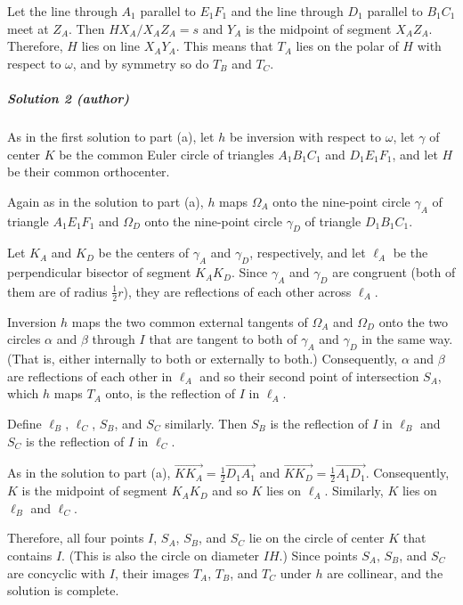 \documentclass[11pt]{scrartcl}
\begin{document}
Let the line through $A_1$ parallel to $E_1F_1$ and the line through $D_1$
parallel to $B_1C_1$ meet at $Z_A$. Then $HX_A/X_AZ_A=s$
and $Y_A$ is the midpoint of segment $X_AZ_A$. Therefore, $H$ lies on
line $X_AY_A$. This means that $T_A$ lies on the polar of $H$ with respect to
$\omega$, and by symmetry so do $T_B$ and $T_C$.


\subparagraph{Solution 2 (author)}

As in the first solution to part (a), let
$h$ be inversion with respect to $\omega$, let $\gamma$ of center $K$ be the common
Euler circle of triangles $A_1B_1C_1$ and $D_1E_1F_1$, and let $H$ be their
common orthocenter.

Again as in the solution to part (a), $h$ maps $\Omega_A$ onto the nine-point
circle $\gamma_A$ of triangle $A_1E_1F_1$ and $\Omega_D$ onto the nine-point
circle $\gamma_D$ of triangle $D_1B_1C_1$.

Let $K_A$ and $K_D$ be the centers of $\gamma_A$ and $\gamma_D$, respectively,
and let $\ell_A$ be the perpendicular bisector of segment $K_AK_D$. Since
$\gamma_A$ and $\gamma_D$ are congruent (both of them are of radius
$\frac{1}{2}r$), they are reflections of each other across $\ell_A$.

Inversion $h$ maps the two common external tangents of $\Omega_A$ and $\Omega_D$
onto the two circles $\alpha$ and $\beta$ through $I$ that are tangent to both
of $\gamma_A$ and $\gamma_D$ in the same way. (That is, either internally to both or
externally to both.) Consequently, $\alpha$ and $\beta$ are reflections of each
other in $\ell_A$ and so their second point of intersection $S_A$, which $h$
maps $T_A$ onto, is the reflection of $I$ in $\ell_A$.

Define $\ell_B$, $\ell_C$, $S_B$, and $S_C$ similarly. Then $S_B$ is the reflection of $I$ in $\ell_B$ and $S_C$ is the reflection of $I$ in $\ell_C$.

As in the solution to part (a),
$\overrightarrow{KK_A}=\frac{1}{2}\overrightarrow{D_1A_1}$ and
$\overrightarrow{KK_D}=\frac{1}{2}\overrightarrow{A_1D_1}$. Consequently, $K$ is
the midpoint of segment $K_AK_D$ and so $K$ lies on $\ell_A$. Similarly, $K$
lies on $\ell_B$ and $\ell_C$.

Therefore, all four points $I$, $S_A$, $S_B$, and $S_C$ lie on the circle of center $K$ that contains $I$. (This is also the circle on diameter $IH$.) Since points $S_A$, $S_B$, and $S_C$ are concyclic with $I$, their images $T_A$, $T_B$, and $T_C$ under $h$ are collinear, and the solution is complete.
\end{document}
